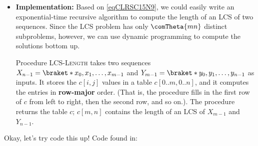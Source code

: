 \begin{itemize}
\item \textbf{Implementation:} Based on \cref{eqCLRSC15N9}, we could easily
  write an exponential-time recursive algorithm to compute the length of an
  LCS of two sequences. Since the LCS problem has only $\comTheta{mn}$
  distinct subproblems, however, we can use dynamic programming to compute
  the solutions bottom up.

  Procedure \textsc{LCS-Length} takes two sequences
  $X_{n-1}=\braket*{x_0,x_1,\ldots,x_{m-1}}$ and
  $Y_{m-1}=\braket*{y_0,y_1,\ldots,y_{n-1}}$ as inputs. It stores the
  $c[i,j]$ values in a table $c[0..m,0..n]$, and it computes the entries in
  \textbf{row-major} order. (That is, the procedure fills in the first row
  of $c$ from left to right, then the second row, and so on.). The procedure
  returns the table $c$; $c[m,n]$ contains the length of an LCS of $X_{m-1}$
  and $Y_{n-1}$.

\end{itemize}


Okay, let's try code this up!
Code found in:\\ 

